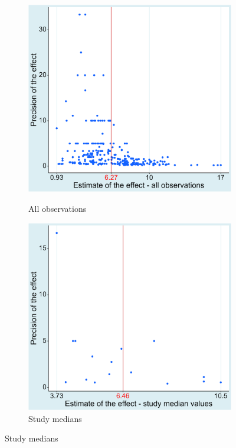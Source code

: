 \begin{figure}[!htbp]
    \begin{center}
        \caption{The twin studies funnel plot}
        \label{fig:funnel_plot_twins}
        \begin{subfigure}[b]{0.45\textwidth}
            \caption{All observations}
            \includegraphics[width=0.95\linewidth]{Figures/funnel_twins.png}
            \label{fig:funnel_plot_twins_all}
        \end{subfigure}
        \begin{subfigure}[b]{0.45\textwidth}
            \caption{Study medians}
            \includegraphics[width=0.95\linewidth]{Figures/funnel_twins_medians.png}

\end{subfigure}
\end{center}
\end{figure}
